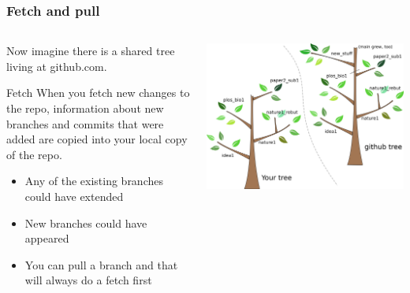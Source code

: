 \documentclass{beamer}
\begin{document}
\begin{frame}
  \frametitle{Fetch and pull}
  \begin{columns}[T]
    \begin{column}{.5\textwidth}
      Now imagine there is a shared tree living at github.com.
      \begin{block}{Fetch}
        When you \alert{fetch} new changes to the \alert{repo}, information
        about new branches and commits that were added are copied into your
        local copy of the repo.
        \begin{itemize}
        \item Any of the existing branches could have extended
        \item New branches could have appeared
        \item You can \alert{pull} a branch and that will always do a
          \alert{fetch} first
        \end{itemize}
      \end{block}
    \end{column}
    \begin{column}{.5\textwidth}
      \includegraphics[width=\textwidth]{tree_newbranches.png}
    \end{column}
  \end{columns}
\end{frame}
\end{document}
